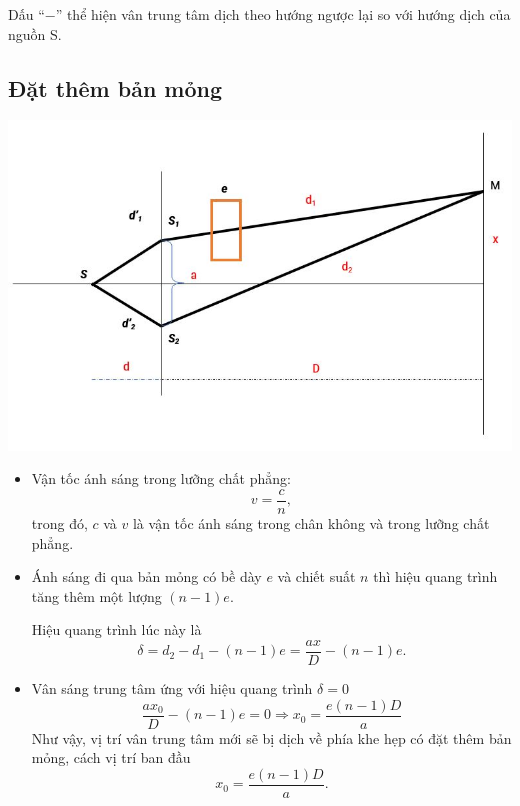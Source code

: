 Dấu ``$-$'' thể hiện vân trung tâm dịch theo hướng ngược lại so với hướng dịch của nguồn S.



\subsection{Đặt thêm bản mỏng}
\begin{center}
	\includegraphics[scale=0.7]{../figs/VN12-PH-33-A-017-4-2.JPG}
\end{center}
\begin{itemize}
	\item Vận tốc ánh sáng trong lưỡng chất phẳng: 
	\begin{equation}
		v=\dfrac{c}{n},
	\end{equation}
	trong đó, $c$ và $v$  là vận tốc ánh sáng trong chân không và trong lưỡng chất phẳng.
	\item Ánh sáng đi qua bản mỏng có bề dày $e$ và chiết suất $n$ thì hiệu quang trình tăng thêm một lượng $(n-1)e$.
	
	Hiệu quang trình lúc này là
	\begin{equation}
		\delta = d_2-d_1-(n-1)e= \dfrac{ax}{D}-(n-1)e. 
	\end{equation}
	\item Vân sáng trung tâm ứng với hiệu quang trình $\delta =0$
	\begin{equation*}
		\dfrac{ax_0}{D}-(n-1)e=0 \Rightarrow x_0=\dfrac {e(n-1)D}{a}
	\end{equation*}
	Như vậy, vị trí vân trung tâm mới sẽ bị dịch về phía khe hẹp có đặt thêm bản mỏng, cách vị trí  ban đầu 
	\begin{equation}
		x_0=\dfrac {e(n-1)D}{a}.
	\end{equation}
\end{itemize}

